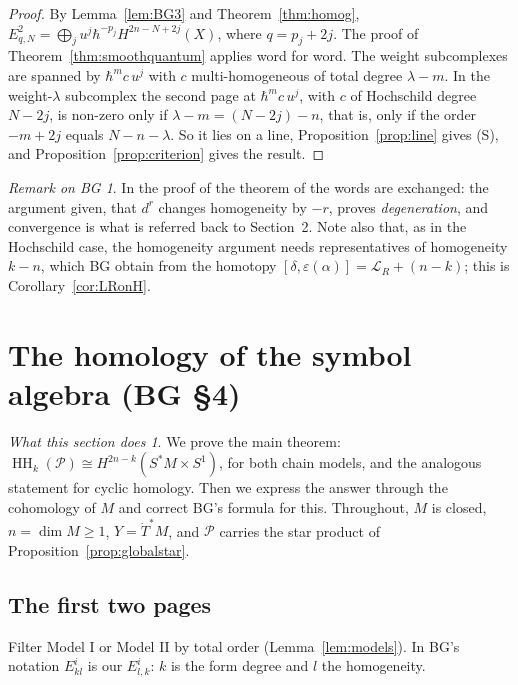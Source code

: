\documentclass[11pt,oneside,reqno]{article}
\DeclareMathOperator{\HH}{HH}
\newcommand{\cP}{\mathcal P}
\newcommand{\Tdot}{\dot T^*}
\newcommand{\eps}{\varepsilon}
\newcommand{\Lie}{\mathcal L}
\newcommand{\hb}{\hbar}
\theoremstyle{plain}
\theoremstyle{definition}
\theoremstyle{remark}
\newtheorem{bgremark}[theorem]{Remark on BG}
\newtheorem*{whatdoes}{What this section does}
\begin{document}
\begin{proof}
By Lemma~\ref{lem:BG3} and Theorem~\ref{thm:homog},
\(E^2_{q,N}=\bigoplus_j u^j\hb^{-p_j}H^{2n-N+2j}(X)\), where \(q=p_j+2j\). The proof of
Theorem~\ref{thm:smoothquantum} applies word for word. The weight subcomplexes
are spanned by \(\hb^mc\,u^j\) with \(c\) multi-homogeneous of total degree
\(\lambda-m\). In the weight-\(\lambda\) subcomplex the second page at
\(\hb^mc\,u^j\), with \(c\) of Hochschild degree \(N-2j\), is non-zero only if
\(\lambda-m=(N-2j)-n\), that is, only if the order \(-m+2j\) equals \(N-n-\lambda\).
So it lies on a line, Proposition~\ref{prop:line} gives (S), and
Proposition~\ref{prop:criterion} gives the result.
\end{proof}

\begin{bgremark}
In the proof of the theorem of \cite[\S3]{BG} the words are exchanged: the
argument given, that \(d^r\) changes homogeneity by \(-r\), proves
\emph{degeneration}, and convergence is what is referred back to
Section~2. Note also that, as in the Hochschild case, the homogeneity argument
needs representatives of homogeneity \(k-n\), which BG obtain from the homotopy
\([\delta,\eps(\alpha)]=\Lie_R+(n-k)\); this is Corollary~\ref{cor:LRonH}.
\end{bgremark}

\section{The homology of the symbol algebra (BG \S4)}\label{sec:symbols}

\begin{whatdoes}
We prove the main theorem: \(\HH_k(\cP)\cong H^{2n-k}(S^*M\times S^1)\), for both chain
models, and the analogous statement for cyclic homology. Then we express
the answer through the cohomology of \(M\) and correct BG's formula for this.
Throughout, \(M\) is closed, \(n=\dim M\ge1\), \(Y=\Tdot M\), and \(\cP\) carries the star
product of Proposition~\ref{prop:globalstar}.
\end{whatdoes}

\subsection{The first two pages}\label{subsec:PE1E2}
Filter Model I or Model II by total order (Lemma~\ref{lem:models}). In BG's
notation \(E^i_{kl}\) is our \(E^i_{l,k}\): \(k\) is the form degree and \(l\) the
homogeneity.
\end{document}

